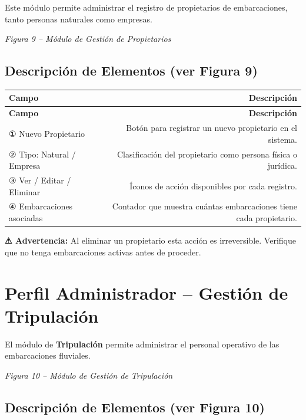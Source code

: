 \documentclass[12pt,a4paper]{article}
\begin{document}
Este módulo permite administrar el registro de propietarios de embarcaciones, tanto personas naturales como empresas.

\textit{Figura 9 -- Módulo de Gestión de Propietarios}

\subsection{Descripción de Elementos (ver Figura 9)}

\begin{longtable}{LR}
  \toprule
  \textbf{Campo} & \textbf{Descripción} \\
  \midrule
  \endfirsthead
  \toprule
  \textbf{Campo} & \textbf{Descripción} \\
  \midrule
  \endhead
  \bottomrule
  \endfoot
  ① Nuevo Propietario         & Botón para registrar un nuevo propietario en el sistema. \\[4pt]
  ② Tipo: Natural / Empresa   & Clasificación del propietario como persona física o jurídica. \\[4pt]
  ③ Ver / Editar / Eliminar   & Íconos de acción disponibles por cada registro. \\[4pt]
  ④ Embarcaciones asociadas   & Contador que muestra cuántas embarcaciones tiene cada propietario. \\
\end{longtable}

\begin{advertenciabox}
\textbf{⚠ Advertencia:} Al eliminar un propietario esta acción es irreversible. Verifique que no tenga embarcaciones activas antes de proceder.
\end{advertenciabox}

\section{Perfil Administrador -- Gestión de Tripulación}

El módulo de \textbf{Tripulación} permite administrar el personal operativo de las embarcaciones fluviales.

\textit{Figura 10 -- Módulo de Gestión de Tripulación}

\subsection{Descripción de Elementos (ver Figura 10)}
\end{document}
